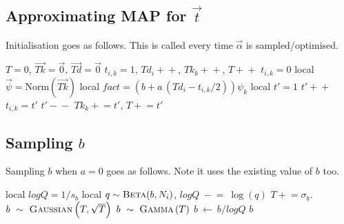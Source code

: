 \documentclass{article}
\newcommand{\doubleminus}{\!-\!\!-}
\newcommand{\doubleplus}{\!+\!\!+}
\newcommand{\plusequal}{\!+\!\!=}
\newcommand{\minusequal}{\!-\!\!=}
\begin{document}
\subsection{Approximating MAP for $\vec{t}$}
\noindent
Initialisation goes as follows.  This is called every time
$\vec\alpha$ is sampled/optimised.
\begin{algorithmic}[5]
    \State $T=0$, $\vec{Tk}=\vec{0}$, $\vec{Td}=\vec{0}$
      \State $t_{i,k}=1$, $Td_i\doubleplus$, $Tk_k\doubleplus$, $T\doubleplus$
      \Else
      \State $t_{i,k}=0$
      \EndIf
      \EndFor
    \EndFor
    \State local $\vec\psi = \mbox{Norm}(\vec{Tk})$
      \State local $fact = (b+a\,(Td_{i}-t_{i,k}/2)) \psi_k$
      \State local $t'=1$
      \State $t'\doubleplus$
      \EndWhile
      \State $t_{i,k}=t'$
      \State $t'\doubleminus$
      \State $Tk_k\plusequal t'$,  $T\plusequal t'$
      \EndIf
      \EndIf
      \EndFor
    \EndFor
    \EndFunction
\end{algorithmic}

\subsection{Sampling $b$}
\noindent
Sampling $b$ when $a=0$ goes as follows.  Note it uses the
existing value of $b$ too.
\begin{algorithmic}[5]
    \State local $logQ=1/s_b$
    \State local $q \sim \mbox{\sc Beta}(b,N_i)$, 
    \State $logQ ~\minusequal~ \log(q)$
    \EndFor
    \State $T \plusequal \sigma_b$.
    \State $b ~\sim~ \mbox{\sc Gaussian}\left(T, \sqrt{T}\right)$    
    \Else
    \State $b ~\sim~ \mbox{\sc Gamma}\left(T\right)$
    \EndIf
     \State $b ~\leftarrow ~  b/logQ$
      $b$
    \EndFunction
\end{algorithmic}
\end{document}
